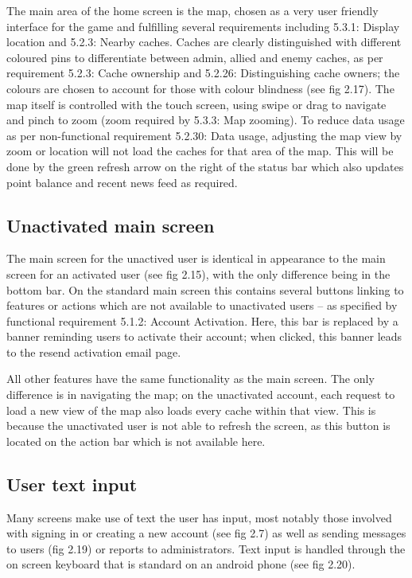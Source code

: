 The main area of the home screen is the map, chosen as a very user friendly interface for the game and fulfilling several requirements including 5.3.1: Display location and 5.2.3: Nearby caches. Caches are clearly distinguished with different coloured pins to differentiate between admin, allied and enemy caches, as per requirement 5.2.3: Cache ownership and 5.2.26: Distinguishing cache owners; the colours are chosen to account for those with colour blindness (see fig 2.17). The map itself is controlled with the touch screen, using swipe or drag to navigate and pinch to zoom (zoom required by 5.3.3: Map zooming). To reduce data usage as per non-functional requirement 5.2.30: Data usage, adjusting the map view by zoom or location will not load the caches for that area of the map. This will be done by the green refresh arrow on the right of the status bar which also updates point balance and recent news feed as required.

\subsection{Unactivated main screen}

The main screen for the unactived user is identical in appearance to the main screen for an activated user (see fig 2.15), with the only difference being in the bottom bar. On the standard main screen this contains several buttons linking to features or actions which are not available to unactivated users – as specified by functional requirement 5.1.2: Account Activation. Here, this bar is replaced by a banner reminding users to activate their account; when clicked, this banner leads to the resend activation email page.

All other features have the same functionality as the main screen. The only difference is in navigating the map; on the unactivated account, each request to load a new view of the map also loads every cache within that view. This is because the unactivated user is not able to refresh the screen, as this button is located on the action bar which is not available here.

\subsection{User text input}

Many screens make use of text the user has input, most notably those involved with signing in or creating a new account (see fig 2.7) as well as sending messages to users (fig 2.19) or reports to administrators. Text input is handled through the on screen keyboard that is standard on an android phone (see fig 2.20). 

